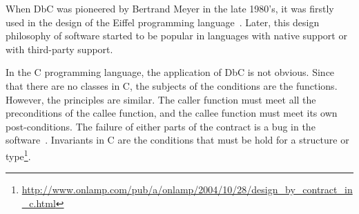When DbC was pioneered by Bertrand Meyer in the late 1980's, it was firstly used in the design of the Eiffel programming language~\cite{ii}. Later, this design philosophy of software started to be popular in languages with native support or with third-party support. 

%
%

In the C programming language, the application of DbC is not obvious. %
Since that there are no classes in C, the subjects of the conditions are the functions. However, the principles are similar. The caller function must meet all the preconditions of the callee function, and the callee function must meet its own post-conditions. The failure of either parts of the contract is a bug in the software~\cite{jj}. Invariants in C are the conditions that must be hold for a structure or type\footnote{\url{http://www.onlamp.com/pub/a/onlamp/2004/10/28/design_by_contract_in_c.html}}. 


